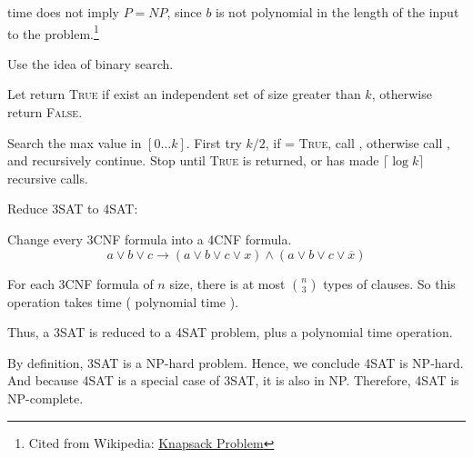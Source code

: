 \documentclass[11pt,letterpaper,titlepage,en-US]{article}
\begin{document}
\begin{homeworkProblem}
\begin{homeworkSubProblem}
     time does not imply $P=NP$, since $b$ is not polynomial in the length of the input
    to the problem.\footnote{Cited from Wikipedia:
    \href{https://en.wikipedia.org/wiki/Knapsack_problem}{Knapsack Problem}}
\end{homeworkSubProblem}

\begin{homeworkSubProblem}
Use the idea of binary search.

Let  return \textsc{True} if exist
an independent set of size greater than $k$, otherwise return \textsc{False}.

Search the max value in $[0 \ldots k]$.
First try $k/2$, if  = \textsc{True},
call ,
otherwise 
call ,
and recursively continue.
Stop until \textsc{True} is returned,
or has made $\lceil\log k\rceil$ recursive calls.

\end{homeworkSubProblem}

\begin{homeworkSubProblem}
Reduce 3SAT to 4SAT:

Change every 3CNF formula into a 4CNF formula.
\[a \lor b \lor c \longrightarrow (a \lor b \lor c \lor x) \land (a \lor b \lor c \lor \overline{x})\]

For each 3CNF formula of $n$ size, there is at most $\binom{n}{3}$ types of clauses.
So this operation takes  time ( polynomial time ).

Thus, a 3SAT is reduced to a 4SAT problem, plus a polynomial time operation.

By definition, 3SAT is a NP-hard problem. Hence, we conclude 4SAT is NP-hard.
And because 4SAT is a special case of 3SAT, it is also in NP.
Therefore, 4SAT is NP-complete.

\end{homeworkSubProblem}

\begin{homeworkSubProblem}

\end{homeworkSubProblem}

\end{homeworkProblem}
\end{document}
